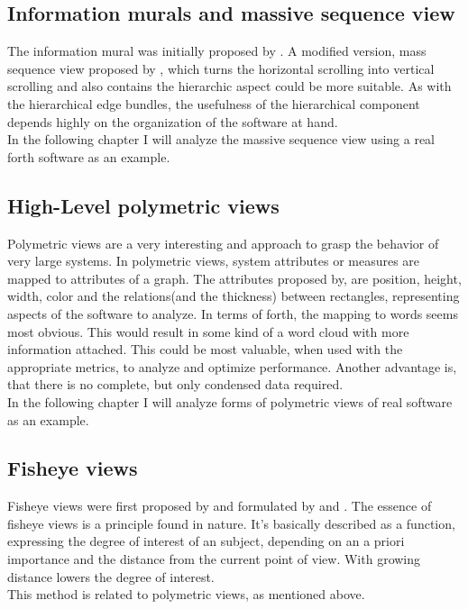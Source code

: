 \subsection*{Information murals and massive sequence view}
The information mural was initially proposed by \cite{Jerding:1998:IMT:614271.614408}. A modified version, mass sequence view proposed by \cite{Cornelissen2009}, which turns the horizontal scrolling into vertical scrolling and also contains the hierarchic aspect could be more suitable. As with the hierarchical edge bundles, the usefulness of the hierarchical component depends highly on the organization of the software at hand.
\\
In the following chapter I will analyze the massive sequence view using a real forth software as an example.

\subsection*{High-Level polymetric views}
Polymetric views\cite{Ducasse:2004:HPV:977397.977739} are a very interesting and approach to grasp the behavior of very large systems. In polymetric views, system attributes or measures are mapped to attributes of a graph. The attributes proposed by\cite{Ducasse:2004:HPV:977397.977739}, are position, height, width, color and the relations(and the thickness) between rectangles, representing aspects of the software to analyze. In terms of forth, the mapping to words seems most obvious. This would result in some kind of a word cloud with more information attached. This could be most valuable, when used with the appropriate metrics, to analyze and optimize performance. Another advantage is, that there is no complete, but  only condensed data required.
\\
In the following chapter I will analyze forms of polymetric views of real software as an example.

\subsection*{Fisheye views}
Fisheye views were first proposed by \cite{Furnas:1986:GFV:22627.22342} and formulated by \cite{Storey:1995:GLA:647547.728600} and \cite{Sarkar:1994:GFV:198366.198384}. The essence of fisheye views is a principle found in nature. It's basically described as a function, expressing the degree of interest of an subject, depending on an a priori importance and the distance from the current point of view. With growing distance lowers the degree of interest.
\\
This method is related to polymetric views, as mentioned above.

